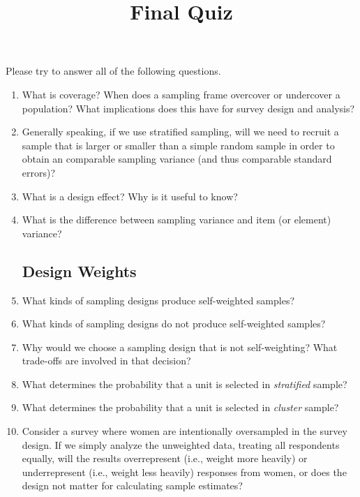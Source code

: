 \documentclass[12pt, a4]{article}
\title{Final Quiz\vspace{-2em}}
\author{}
\date{}
\begin{document}
\maketitle

\noindent Please try to answer all of the following questions.

\begin{enumerate}
	
\subsection*{Sampling Design}

\item What is coverage? When does a sampling frame overcover or undercover a population? What implications does this have for survey design and analysis?
\item Generally speaking, if we use stratified sampling, will we need to recruit a sample that is larger or smaller than a simple random sample in order to obtain an comparable sampling variance (and thus comparable standard errors)?
\item What is a design effect? Why is it useful to know?
\item What is the difference between sampling variance and item (or element) variance?

\subsection*{Design Weights}

\item What kinds of sampling designs produce self-weighted samples?
\item What kinds of sampling designs do not produce self-weighted samples?
\item Why would we choose a sampling design that is not self-weighting? What trade-offs are involved in that decision?
\item What determines the probability that a unit is selected in \textit{stratified} sample?
\item What determines the probability that a unit is selected in \textit{cluster} sample?
\item Consider a survey where women are intentionally oversampled in the survey design. If we simply analyze the unweighted data, treating all respondents equally, will the results overrepresent (i.e., weight more heavily) or underrepresent (i.e., weight less heavily) responses from women, or does the design not matter for calculating sample estimates?


\end{enumerate}
\end{document}
